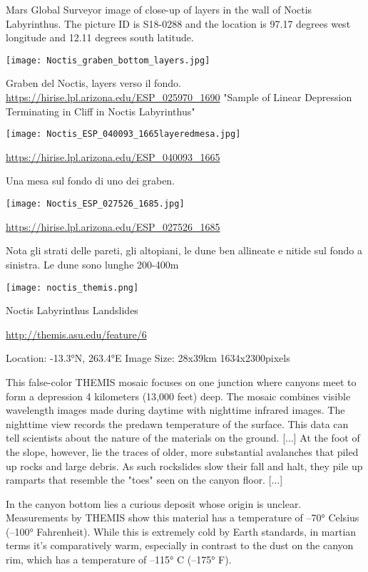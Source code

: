 \documentclass[a4paper,10pt,openany,oneside]{memoir}
\begin{document}
Mars Global Surveyor image of close-up of layers in the wall of Noctis Labyrinthus. The picture ID is S18-0288 and the location is 97.17 degrees west longitude and 12.11 degrees south latitude.



\texttt{[image: Noctis\_graben\_bottom\_layers.jpg]}

Graben del Noctis, layers verso il fondo. \url{https://hirise.lpl.arizona.edu/ESP_025970_1690} "Sample of Linear Depression Terminating in Cliff in Noctis Labyrinthus"



\texttt{[image: Noctis\_ESP\_040093\_1665layeredmesa.jpg]}

\url{https://hirise.lpl.arizona.edu/ESP_040093_1665}

Una mesa sul fondo di uno dei graben.



\texttt{[image: Noctis\_ESP\_027526\_1685.jpg]}

\url{https://hirise.lpl.arizona.edu/ESP_027526_1685}

Nota gli strati delle pareti, gli altopiani, le dune ben allineate e nitide sul fondo a sinistra. Le dune sono lunghe 200-400m




\texttt{[image: noctis\_themis.png]}

Noctis Labyrinthus Landslides

\url{http://themis.asu.edu/feature/6}

Location: -13.3°N, 263.4°E  
Image Size: 28x39km 1634x2300pixels

This false-color THEMIS mosaic focuses on one junction where canyons meet to form a depression 4 kilometers (13,000 feet) deep. The mosaic combines visible wavelength images made during daytime with nighttime infrared images. The nighttime view records the predawn temperature of the surface. This data can tell scientists about the nature of the materials on the ground. [...] At the foot of the slope, however, lie the traces of older, more substantial avalanches that piled up rocks and large debris. As such rockslides slow their fall and halt, they pile up ramparts that resemble the "toes" seen on the canyon floor. [...] 

In the canyon bottom lies a curious deposit whose origin is unclear. Measurements by THEMIS show this material has a temperature of –70° Celsius (–100° Fahrenheit). While this is extremely cold by Earth standards, in martian terms it's comparatively warm, especially in contrast to the dust on the canyon rim, which has a temperature of –115° C (–175° F).
 
\end{document}
